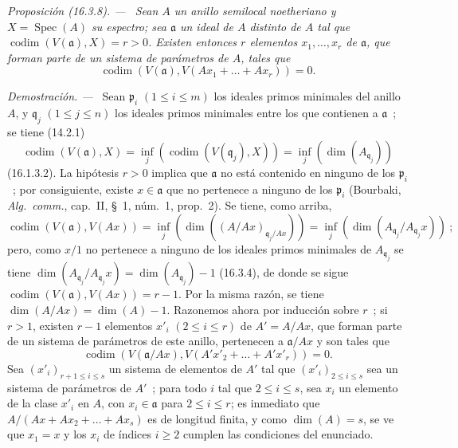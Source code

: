 \documentclass[10pt,oneside]{book}
\makeatletter
\newcommand{\setmanualcurrentlabel}[1]{\def\@currentlabel{#1}}
\newcommand{\oldpage}[2][]{%
  \setcounter{footnote}{0}%
  \marginpar{\scriptsize\textbf{#1}~|~#2}\ignorespaces}
\newenvironment{proposition}[1][]{%
  \setmanualcurrentlabel{#1}\par\medskip\noindent\itshape Proposición (#1). ---\ }{\par}
\newenvironment{proof}{%
  \par\medskip\noindent\textit{Demostración. ---\ }}{\par}
\makeatother
\begin{document}
\oldpage[0\textsubscript{IV-1}]{31}

\begin{proposition}[16.3.8]
\label{0.16.3.8-es}
Sean $A$ un anillo semilocal noetheriano y $X=\operatorname{Spec}(A)$ su
espectro; sea $\mathfrak{a}$ un ideal de $A$ distinto de $A$ tal que
$\operatorname{codim}(V(\mathfrak{a}),X)=r>0$. Existen entonces $r$ elementos
$x_1,\ldots,x_r$ de $\mathfrak{a}$, que forman parte de un sistema de parámetros
de $A$, tales que
\[
  \operatorname{codim}(V(\mathfrak{a}),
  V(Ax_1+\ldots+Ax_r))=0.
\]
\end{proposition}

\begin{proof}
Sean $\mathfrak{p}_i$ $(1\leq i\leq m)$ los ideales primos minimales del
anillo $A$, y $\mathfrak{q}_j$ $(1\leq j\leq n)$ los ideales primos minimales
entre los que contienen a $\mathfrak{a}$~; se tiene (14.2.1)
\[
  \operatorname{codim}(V(\mathfrak{a}),X)
  =\inf_j(\operatorname{codim}(V(\mathfrak{q}_j),X))
  =\inf_j(\dim(A_{\mathfrak{q}_j}))
\]
(16.1.3.2). La hipótesis $r>0$ implica que $\mathfrak{a}$ no está contenido en
ninguno de los $\mathfrak{p}_i$~; por consiguiente, existe
$x\in\mathfrak{a}$ que no pertenece a ninguno de los $\mathfrak{p}_i$
(Bourbaki, \emph{Alg.~comm.}, cap.~II, \S~1, núm.~1, prop.~2). Se tiene, como
arriba,
\[
  \operatorname{codim}(V(\mathfrak{a}),V(Ax))
  =\inf_j(\dim((A/Ax)_{\mathfrak{q}_j/Ax}))
  =\inf_j(\dim(A_{\mathfrak{q}_j}/A_{\mathfrak{q}_j}x))~;
\]
pero, como $x/1$ no pertenece a ninguno de los ideales primos minimales
de $A_{\mathfrak{q}_j}$ se tiene
$\dim(A_{\mathfrak{q}_j}/A_{\mathfrak{q}_j}x)
=\dim(A_{\mathfrak{q}_j})-1$ (16.3.4), de donde se sigue
$\operatorname{codim}(V(\mathfrak{a}),V(Ax))=r-1$. Por la misma razón, se tiene
$\dim(A/Ax)=\dim(A)-1$. Razonemos ahora por inducción sobre $r$~; si
$r>1$, existen $r-1$ elementos $x'_i$ $(2\leq i\leq r)$ de $A'=A/Ax$,
que forman parte de un sistema de parámetros de este anillo, pertenecen a
$\mathfrak{a}/Ax$ y son tales que
\[
  \operatorname{codim}(V(\mathfrak{a}/Ax),
  V(A'x'_2+\ldots+A'x'_r))=0.
\]
Sea $(x'_i)_{r+1\leq i\leq s}$ un sistema de elementos de $A'$ tal que
$(x'_i)_{2\leq i\leq s}$ sea un sistema de parámetros de $A'$~; para todo
$i$ tal que $2\leq i\leq s$, sea $x_i$ un elemento de la clase $x'_i$ en
$A$, con $x_i\in\mathfrak{a}$ para $2\leq i\leq r$; es inmediato que
$A/(Ax+Ax_2+\ldots+Ax_s)$ es de longitud finita, y como $\dim(A)=s$, se ve
que $x_1=x$ y los $x_i$ de índices $i\geq2$ cumplen las condiciones del
enunciado.
\end{proof}
\end{document}
